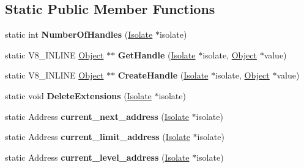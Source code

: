\subsection*{Static Public Member Functions}
\begin{DoxyCompactItemize}
\item 
static int {\bfseries Number\+Of\+Handles} (\hyperlink{classv8_1_1internal_1_1_isolate}{Isolate} $\ast$isolate)\hypertarget{classv8_1_1internal_1_1_handle_scope_a24b3e5fe5858089d5f677b6e81fb17b4}{}\label{classv8_1_1internal_1_1_handle_scope_a24b3e5fe5858089d5f677b6e81fb17b4}

\item 
static V8\+\_\+\+I\+N\+L\+I\+NE \hyperlink{classv8_1_1internal_1_1_object}{Object} $\ast$$\ast$ {\bfseries Get\+Handle} (\hyperlink{classv8_1_1internal_1_1_isolate}{Isolate} $\ast$isolate, \hyperlink{classv8_1_1internal_1_1_object}{Object} $\ast$value)\hypertarget{classv8_1_1internal_1_1_handle_scope_abf6dce242d1def3c4b95806a037d43ad}{}\label{classv8_1_1internal_1_1_handle_scope_abf6dce242d1def3c4b95806a037d43ad}

\item 
static V8\+\_\+\+I\+N\+L\+I\+NE \hyperlink{classv8_1_1internal_1_1_object}{Object} $\ast$$\ast$ {\bfseries Create\+Handle} (\hyperlink{classv8_1_1internal_1_1_isolate}{Isolate} $\ast$isolate, \hyperlink{classv8_1_1internal_1_1_object}{Object} $\ast$value)\hypertarget{classv8_1_1internal_1_1_handle_scope_aa194809b8c7db1abb174737964fc7fa4}{}\label{classv8_1_1internal_1_1_handle_scope_aa194809b8c7db1abb174737964fc7fa4}

\item 
static void {\bfseries Delete\+Extensions} (\hyperlink{classv8_1_1internal_1_1_isolate}{Isolate} $\ast$isolate)\hypertarget{classv8_1_1internal_1_1_handle_scope_a49d50c5b71e4d3aed324e3ce63bb681d}{}\label{classv8_1_1internal_1_1_handle_scope_a49d50c5b71e4d3aed324e3ce63bb681d}

\item 
static Address {\bfseries current\+\_\+next\+\_\+address} (\hyperlink{classv8_1_1internal_1_1_isolate}{Isolate} $\ast$isolate)\hypertarget{classv8_1_1internal_1_1_handle_scope_a4ab0caf3631e3b3f5aa40d20696ca6cc}{}\label{classv8_1_1internal_1_1_handle_scope_a4ab0caf3631e3b3f5aa40d20696ca6cc}

\item 
static Address {\bfseries current\+\_\+limit\+\_\+address} (\hyperlink{classv8_1_1internal_1_1_isolate}{Isolate} $\ast$isolate)\hypertarget{classv8_1_1internal_1_1_handle_scope_a49204b2b24d948e6a4b2cec31f043a0c}{}\label{classv8_1_1internal_1_1_handle_scope_a49204b2b24d948e6a4b2cec31f043a0c}

\item 
static Address {\bfseries current\+\_\+level\+\_\+address} (\hyperlink{classv8_1_1internal_1_1_isolate}{Isolate} $\ast$isolate)\hypertarget{classv8_1_1internal_1_1_handle_scope_ad8e3d2e7853cee42d7d255e45afb1f5e}{}\label{classv8_1_1internal_1_1_handle_scope_ad8e3d2e7853cee42d7d255e45afb1f5e}

\end{DoxyCompactItemize}
